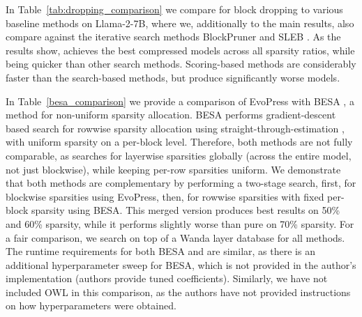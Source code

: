 In Table~\ref{tab:dropping_comparison} we compare \methodname{} for block dropping to various baseline methods on Llama-2-7B, where we, additionally to the main results, also compare against the iterative search methods BlockPruner \cite{zhong2024blockpruner} and SLEB \cite{song2024sleb}. As the results show, \methodname{} achieves the best compressed models across all sparsity ratios, while being quicker than other search methods. Scoring-based methods are considerably faster than the search-based methods, but produce significantly worse models.



In Table~\ref{besa_comparison} we provide a comparison of EvoPress with BESA \cite{xu2024besapruninglargelanguage}, a method for non-uniform sparsity allocation. BESA performs gradient-descent based search for rowwise sparsity allocation using straight-through-estimation \cite{bengio2013estimating}, with uniform sparsity on a per-block level. Therefore, both methods are not fully comparable, as \methodname{} searches for layerwise sparsities globally (across the entire model, not just blockwise), while keeping per-row sparsities uniform. We demonstrate that both methods are complementary by performing a two-stage search, first, for blockwise sparsities using EvoPress, then, for rowwise sparsities with fixed per-block sparsity using BESA. This merged version produces best results on 50\% and 60\% sparsity, while it performs slightly worse than pure \methodname{} on 70\% sparsity. For a fair comparison, we search on top of a Wanda \cite{wanda} layer database for all methods. The runtime requirements for both BESA and \methodname{} are similar, as there is an additional hyperparameter sweep for BESA, which is not provided in the author's implementation (authors provide tuned coefficients). Similarly, we have not included OWL in this comparison, as the authors have not provided instructions on how  hyperparameters were obtained.







